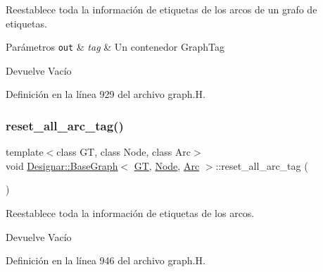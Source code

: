 Reestablece toda la información de etiquetas de los arcos de un grafo de etiquetas. 


\begin{DoxyParams}[1]{Parámetros}
\mbox{\tt out}  & {\em tag} & Un contenedor Graph\+Tag \\
\hline
\end{DoxyParams}
\begin{DoxyReturn}{Devuelve}
Vacío 
\end{DoxyReturn}


Definición en la línea 929 del archivo graph.\+H.

\mbox{\label{class_designar_1_1_base_graph_af9ae2a4dfd676090de4b4fa04414989c}} 
\subsubsection{\texorpdfstring{reset\+\_\+all\+\_\+arc\+\_\+tag()}{reset\_all\_arc\_tag()}\hspace{0.1cm}{\footnotesize\ttfamily [2/2]}}
{\footnotesize\ttfamily template$<$class GT, class Node, class Arc$>$ \\
void \hyperlink{class_designar_1_1_base_graph}{Designar\+::\+Base\+Graph}$<$ \hyperlink{demo-buildgraph_8_c_a3001c40d2c31ca87ed96cd7d1334a55e}{GT}, \hyperlink{namespace_designar_a5af326c65aa2bd26b26c410f2030d09e}{Node}, \hyperlink{namespace_designar_a3f55fb5513d62ff47cbc8f72b8e95d6f}{Arc} $>$\+::reset\+\_\+all\+\_\+arc\+\_\+tag (\begin{DoxyParamCaption}{ }\end{DoxyParamCaption})\hspace{0.3cm}{\ttfamily [inline]}}



Reestablece toda la información de etiquetas de los arcos. 

\begin{DoxyReturn}{Devuelve}
Vacío 
\end{DoxyReturn}


Definición en la línea 946 del archivo graph.\+H.

\mbox{\label{class_designar_1_1_base_graph_a07ca1909d77210157b8b9571a4d35d6c}} 

